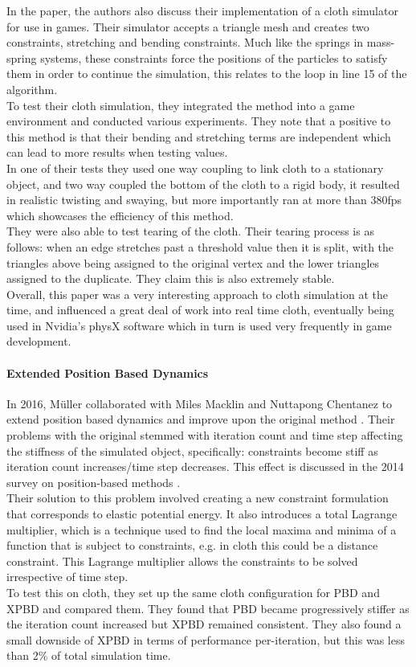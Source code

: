 \documentclass[12pt,a4paper]{article}
\begin{document}
In the paper, the authors also discuss their implementation of a cloth simulator for use in games. Their simulator accepts a triangle mesh and creates two constraints, stretching and bending constraints. Much like the springs in mass-spring systems, these constraints force the positions of the particles to satisfy them in order to continue the simulation, this relates to the loop in line 15 of the algorithm.
\\
To test their cloth simulation, they integrated the method into a game environment and conducted various experiments. They note that a positive to this method is that their bending and stretching terms are independent which can lead to more results when testing values. \\ 
In one of their tests they used one way coupling to link cloth to a stationary object, and two way coupled the bottom of the cloth to a rigid body, it resulted in realistic twisting and swaying, but more importantly ran at more than 380fps which showcases the efficiency of this method. \\
They were also able to test tearing of the cloth. Their tearing process is as follows: when an edge stretches past a threshold value then it is split, with the triangles above being assigned to the original vertex and the lower triangles assigned to the duplicate. They claim this is also extremely stable.\\

Overall, this paper was a very interesting approach to cloth simulation at the time, and influenced a great deal of work into real time cloth, eventually being used in Nvidia's physX software which in turn is used very frequently in game development.

\paragraph{Extended Position Based Dynamics}
In 2016, Müller collaborated with Miles Macklin and Nuttapong Chentanez to extend position based dynamics and improve upon the original method \cite{macklin2016xpbd}. Their problems with the original stemmed with iteration count and time step affecting the stiffness of the simulated object, specifically: constraints become stiff as iteration count increases/time step decreases. This effect is discussed in the 2014 survey on position-based methods \cite{bender2014survey}. \\
Their solution to this problem involved creating a new constraint formulation that corresponds to elastic potential energy. It also introduces a total Lagrange multiplier, which is a technique used to find the local maxima and minima of a function that is subject to constraints, e.g. in cloth this could be a distance constraint. This Lagrange multiplier allows the constraints to be solved irrespective of time step.\\
To test this on cloth, they set up the same cloth configuration for PBD and XPBD and compared them. They found that PBD became progressively stiffer as the iteration count increased but XPBD remained consistent. They also found a small downside of XPBD in terms of performance per-iteration, but this was less than 2\% of total simulation time. \\
\end{document}
